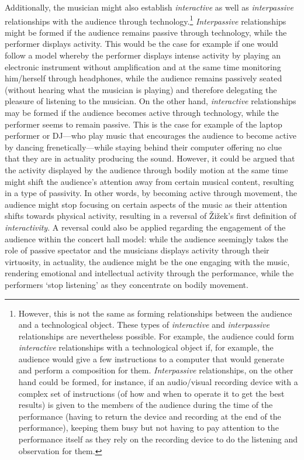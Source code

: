 Additionally, the musician might also establish \emph{interactive} as well as \emph{interpassive} relationships with the audience through technology.\footnote{However, this is not the same as forming relationships between the audience and a technological object. These types of \emph{interactive} and \emph{interpassive} relationships are nevertheless possible. For example, the audience could form \emph{interactive} relationships with a technological object if, for example, the audience would give a few instructions to a computer that would generate and perform a composition for them. \emph{Interpassive} relationships, on the other hand could be formed, for instance, if an audio/visual recording device with a complex set of instructions (of how and when to operate it to get the best results) is given to the members of the audience during the time of the performance (having to return the device and recording at the end of the performance), keeping them busy but not having to pay attention to the performance itself as they rely on the recording device to do the listening and observation for them.} \emph{Interpassive} relationships might be formed if the audience remains passive through technology, while the performer displays activity. This would be the case for example if one would follow a model whereby the performer displays intense activity by playing an electronic instrument without amplification and at the same time monitoring him/herself through headphones, while the audience remains passively seated (without hearing what the musician is playing) and therefore delegating the pleasure of listening to the musician. On the other hand, \emph{interactive} relationships may be formed if the audience becomes active through technology, while the performer seems to remain passive. This is the case for example of the laptop performer or DJ---who play music that encourages the audience to become active by dancing frenetically---while staying behind their computer offering no clue that they are in actuality producing the sound. However, it could be argued that the activity displayed by the audience through bodily motion at the same time might shift the audience's attention away from certain musical content, resulting in a type of passivity. In other words, by becoming active through movement, the audience might stop focusing on certain aspects of the music as their attention shifts towards physical activity, resulting in a reversal of \v{Z}i\v{z}ek's first definition of \emph{interactivity}. A reversal could also be applied regarding the engagement of the audience within the concert hall model: while the audience seemingly takes the role of passive spectator and the musicians displays activity through their virtuosity, in actuality, the audience might be the one engaging with the music, rendering emotional and intellectual activity through the performance, while the performers `stop listening' as they concentrate on bodily movement.  

